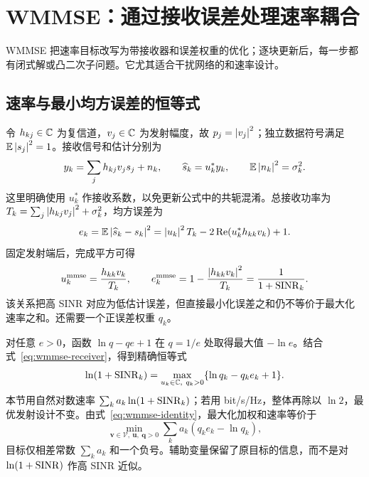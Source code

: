 \section{WMMSE：通过接收误差处理速率耦合}
\label{sec:wmmse}

WMMSE 把速率目标改写为带接收器和误差权重的优化；逐块更新后，每一步都有闭式解或凸二次子问题。它尤其适合干扰网络的和速率设计\cite{shi2011}。

\subsection{速率与最小均方误差的恒等式}

令 $h_{kj}\in\mathbb C$ 为复信道，$v_j\in\mathbb C$ 为发射幅度，故 $p_j=\left\lvert v_j\right\rvert^2$；独立数据符号满足 $\mathbb E\left\lvert s_j\right\rvert^2=1$。接收信号和估计分别为
\begin{equation}
 y_k=\sum_jh_{kj}v_js_j+n_k,\qquad
 \widehat s_k=u_k^*y_k,\qquad \mathbb E\left\lvert n_k\right\rvert^2=\sigma_k^2.
\end{equation}
这里明确使用 $u_k^*$ 作接收系数，以免更新公式中的共轭混淆。总接收功率为 $T_k=\sum_j\left\lvert h_{kj}v_j\right\rvert^2+\sigma_k^2$，均方误差为
\begin{equation}
 e_k=\mathbb E\left\lvert \widehat s_k-s_k\right\rvert^2
 =\left\lvert u_k\right\rvert^2T_k-2\operatorname{Re}(u_k^*h_{kk}v_k)+1.
 \label{eq:wmmse-mse}
\end{equation}
固定发射端后，完成平方可得
\begin{equation}
 u_k^{\rm mmse}=\frac{h_{kk}v_k}{T_k},\qquad
 e_k^{\rm mmse}=1-\frac{\left\lvert h_{kk}v_k\right\rvert^2}{T_k}
 =\frac{1}{1+\operatorname{SINR}_k}.
 \label{eq:wmmse-receiver}
\end{equation}
该关系把高 SINR 对应为低估计误差，但直接最小化误差之和仍不等价于最大化速率之和。还需要一个正误差权重 $q_k$。

对任意 $e>0$，函数 $\ln q-qe+1$ 在 $q=1/e$ 处取得最大值 $-\ln e$。结合式~\eqref{eq:wmmse-receiver}，得到精确恒等式
\begin{equation}
 \ln(1+\operatorname{SINR}_k)=
 \max_{u_k\in\mathbb C,\ q_k>0}\{\ln q_k-q_ke_k+1\}.
 \label{eq:wmmse-identity}
\end{equation}
本节用自然对数速率 $\sum_k a_k\ln(1+\operatorname{SINR}_k)$；若用 bit/s/Hz，整体再除以 $\ln2$，最优发射设计不变。由式~\eqref{eq:wmmse-identity}，最大化加权和速率等价于
\begin{equation}
 \min_{\bm v\in\mathcal V,\ \bm u,\ \bm q>0}
 \sum_k a_k(q_ke_k-\ln q_k),
 \label{eq:wmmse-problem}
\end{equation}
目标仅相差常数 $\sum_k a_k$ 和一个负号。辅助变量保留了原目标的信息，而不是对 $\ln(1+\operatorname{SINR})$ 作高 SINR 近似。

